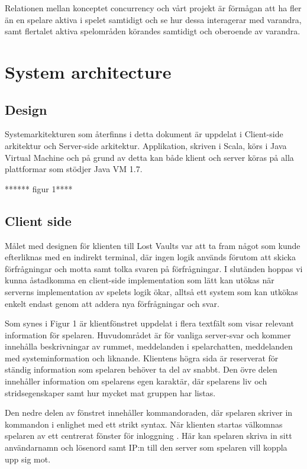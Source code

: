 \documentclass[a4paper]{article}
\begin{document}
Relationen mellan konceptet concurrency och vårt projekt är förmågan att ha fler än en spelare aktiva i spelet samtidigt och se hur dessa interagerar med varandra, samt flertalet 
aktiva spelområden körandes samtidigt och oberoende av varandra.

\section{System architecture}
\subsection{Design}
Systemarkitekturen som återfinns i detta dokument är uppdelat i Client-side arkitektur och Server-side arkitektur. Applikation, skriven i Scala, körs i Java Virtual Machine och på 
grund av detta kan både klient och server köras på alla plattformar som stödjer Java VM 1.7.


****** figur 1****




\subsection{Client side}
Målet med designen för klienten till Lost Vaults var att ta fram något som kunde efterliknas med en indirekt terminal, där ingen logik används förutom att skicka förfrågningar och 
motta samt tolka svaren på förfrågningar. I slutänden hoppas vi kunna åstadkomma en client-side implementation som lätt kan utökas när serverns implementation av spelets logik ökar, 
alltså ett system som kan utkökas enkelt endast genom att addera nya förfrågningar och svar.

Som synes i Figur 1 är klientfönstret uppdelat i flera textfält som visar relevant information för spelaren. Huvudområdet är för vanliga server-svar och kommer innehålla beskrivningar 
av rummet, meddelanden i spelarchatten, meddelanden med systeminformation och liknande. Klientens högra sida är reserverat för ständig information som spelaren behöver ta del av snabbt. 
Den övre delen innehåller information om spelarens egen karaktär, där spelarens liv och stridsegenskaper samt hur mycket mat gruppen har listas. 

Den nedre delen av fönstret innehåller kommandoraden, där spelaren skriver in kommandon i enlighet med ett strikt syntax. När klienten startas välkomnas spelaren 
av ett centrerat fönster för inloggning . Här kan spelaren skriva in sitt användarnamn och lösenord samt IP:n till den server som spelaren vill koppla upp sig mot. 
\end{document}
